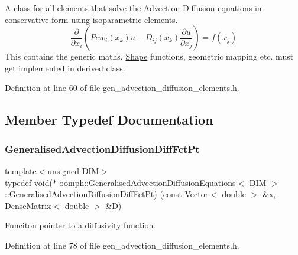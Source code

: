A class for all elements that solve the Advection Diffusion equations in conservative form using isoparametric elements. \[ \frac{\partial}{\partial x_{i}}\left( Pe w_{i}(x_{k}) u - D_{ij}(x_{k})\frac{\partial u}{\partial x_{j}}\right) = f(x_{j}) \] This contains the generic maths. \hyperlink{classoomph_1_1Shape}{Shape} functions, geometric mapping etc. must get implemented in derived class. 

Definition at line 60 of file gen\+\_\+advection\+\_\+diffusion\+\_\+elements.\+h.



\subsection{Member Typedef Documentation}
\mbox{\label{classoomph_1_1GeneralisedAdvectionDiffusionEquations_a637371a9eebc399023c6a652e8219263}} 
\subsubsection{\texorpdfstring{Generalised\+Advection\+Diffusion\+Diff\+Fct\+Pt}{GeneralisedAdvectionDiffusionDiffFctPt}}
{\footnotesize\ttfamily template$<$unsigned D\+IM$>$ \\
typedef void($\ast$ \hyperlink{classoomph_1_1GeneralisedAdvectionDiffusionEquations}{oomph\+::\+Generalised\+Advection\+Diffusion\+Equations}$<$ D\+IM $>$\+::Generalised\+Advection\+Diffusion\+Diff\+Fct\+Pt) (const \hyperlink{classoomph_1_1Vector}{Vector}$<$ double $>$ \&x, \hyperlink{classoomph_1_1DenseMatrix}{Dense\+Matrix}$<$ double $>$ \&D)}



Funciton pointer to a diffusivity function. 



Definition at line 78 of file gen\+\_\+advection\+\_\+diffusion\+\_\+elements.\+h.

\mbox{\label{classoomph_1_1GeneralisedAdvectionDiffusionEquations_ad65d34bc0348f8b297c185d1772eafd9}} 
